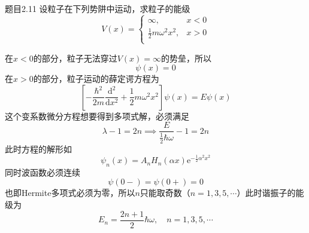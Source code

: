 \begin{question}{题目2.11}
    设粒子在下列势阱中运动，求粒子的能级
    $$
        V(x)=\begin{cases}
            \infty,                  & x<0 \\
            \frac{1}{2}m\omega^2x^2, & x>0 \\
        \end{cases}
    $$
\end{question}
\begin{solution}
    在$x<0$的部分，粒子无法穿过$V(x)=\infty$的势垒，所以
    $$
        \psi(x)=0
    $$
    在$x>0$的部分，粒子运动的薛定谔方程为
    $$
        \left[-\frac{\hbar^2}{2m}\frac{\mathrm{d}^2}{\mathrm{d}x^2}+\frac{1}{2}m\omega^2x^2\right]\psi(x) = E\psi(x)
    $$
    这个变系数微分方程想要得到多项式解，必须满足
    $$
        \lambda-1=2n \implies \frac{E}{\frac{1}{2}\hbar\omega}-1=2n
    $$
    此时方程的解形如
    $$
        \psi_n(x)=A_nH_n(\alpha x)\mathrm{e}^{-\frac{1}{2}\alpha^2x^2}
    $$
    同时波函数必须连续
    $$
        \psi(0-)=\psi(0+)=0
    $$
    也即Hermite多项式必须为零，所以$n$只能取奇数（$n=1,3,5,\cdots$）此时谐振子的能级为
    $$
        E_n = \frac{2n+1}{2}\hbar\omega,
        \quad
        n=1,3,5,\cdots
    $$
\end{solution}

